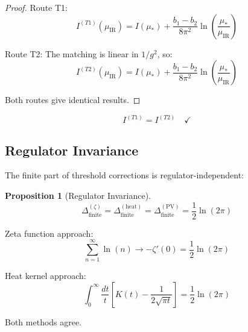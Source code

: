 \documentclass[11pt,a4paper]{article}
\theoremstyle{definition}
\newtheorem{proposition}[theorem]{Proposition}
\begin{document}
\begin{proof}
Route T1:
\begin{equation}
\label{eq:T1}
I^{(T1)}(\mu_{\text{IR}}) = I(\mu_*) + \frac{b_1 - b_2}{8\pi^2}\ln\left(\frac{\mu_*}{\mu_{\text{IR}}}\right)
\end{equation}

Route T2: The matching is linear in $1/g^2$, so:
\begin{equation}
\label{eq:T2}
I^{(T2)}(\mu_{\text{IR}}) = I(\mu_*) + \frac{b_1 - b_2}{8\pi^2}\ln\left(\frac{\mu_*}{\mu_{\text{IR}}}\right)
\end{equation}

Both routes give identical results.
\end{proof}

\begin{equation}
\label{eq:scheme_check}
I^{(T1)} = I^{(T2)} \quad \checkmark
\end{equation}

\subsection{Regulator Invariance}
\label{subsec:regulator}

The finite part of threshold corrections is regulator-independent:

\begin{proposition}[Regulator Invariance]
\label{prop:regulator}
\begin{equation}
\label{eq:reg_inv}
\Delta^{(\zeta)}_{\text{finite}} = \Delta^{(\text{heat})}_{\text{finite}} = \Delta^{(\text{PV})}_{\text{finite}} = \frac{1}{2}\ln(2\pi)
\end{equation}
\end{proposition}

Zeta function approach:
\begin{equation}
\label{eq:zeta_approach}
\sum_{n=1}^{\infty}\ln(n) \to -\zeta'(0) = \frac{1}{2}\ln(2\pi)
\end{equation}

Heat kernel approach:
\begin{equation}
\label{eq:heat_approach}
\int_0^{\infty}\frac{dt}{t}\left[K(t) - \frac{1}{2\sqrt{\pi t}}\right] = \frac{1}{2}\ln(2\pi)
\end{equation}

Both methods agree.
\end{document}
